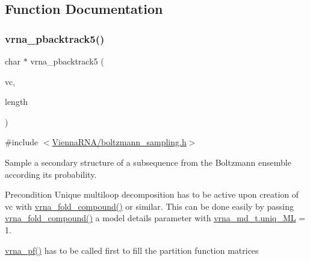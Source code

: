 \subsection{Function Documentation}
\mbox{\label{group__subopt__stochbt_ga347375a4da8bdff74639529847f97d4f}} 
\subsubsection{\texorpdfstring{vrna\+\_\+pbacktrack5()}{vrna\_pbacktrack5()}}
{\footnotesize\ttfamily char $\ast$ vrna\+\_\+pbacktrack5 (\begin{DoxyParamCaption}\item[{\mbox{\hyperlink{group__fold__compound_ga1b0cef17fd40466cef5968eaeeff6166}{vrna\+\_\+fold\+\_\+compound\+\_\+t}} $\ast$}]{vc,  }\item[{int}]{length }\end{DoxyParamCaption})}



{\ttfamily \#include $<$\mbox{\hyperlink{boltzmann__sampling_8h}{Vienna\+R\+N\+A/boltzmann\+\_\+sampling.\+h}}$>$}



Sample a secondary structure of a subsequence from the Boltzmann ensemble according its probability. 

\begin{DoxyPrecond}{Precondition}
Unique multiloop decomposition has to be active upon creation of {\ttfamily vc} with \mbox{\hyperlink{group__fold__compound_ga6601d994ba32b11511b36f68b08403be}{vrna\+\_\+fold\+\_\+compound()}} or similar. This can be done easily by passing \mbox{\hyperlink{group__fold__compound_ga6601d994ba32b11511b36f68b08403be}{vrna\+\_\+fold\+\_\+compound()}} a model details parameter with \mbox{\hyperlink{group__model__details_ade065b814a4e2e72ead93ab502613ed2}{vrna\+\_\+md\+\_\+t.\+uniq\+\_\+\+ML}} = 1. 

\mbox{\hyperlink{group__pf__fold_ga29e256d688ad221b78d37f427e0e99bc}{vrna\+\_\+pf()}} has to be called first to fill the partition function matrices
\end{DoxyPrecond}

